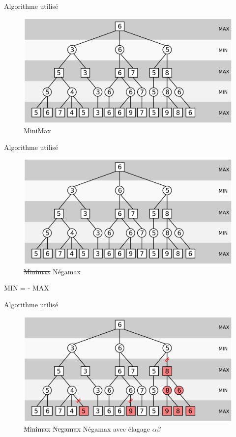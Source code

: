 \documentclass[compress, 12pt]{beamer}
\begin{document}
\begin{frame}{Algorithme utilisé}
  \begin{figure}
    \includegraphics[width=\textwidth]{pix/minimax}
    \centering
    \caption{MiniMax}
  \end{figure}
\end{frame}

\begin{frame}{Algorithme utilisé}
  \begin{figure}
    \includegraphics[width=\textwidth]{pix/minimax}
    \centering
    \caption{\st{Minimax} Négamax}
  \end{figure}
  \begin{center}
  MIN = - MAX
  \end{center}
\end{frame}

\begin{frame}{Algorithme utilisé}
  \begin{figure}
    \includegraphics[height=0.6\textheight]{pix/alphabeta}
    \centering
    \caption{
        \st{Minimax}
        \st{Negamax}
        Négamax avec élagage $\alpha\beta$}
  \end{figure}
\end{frame}
\end{document}
